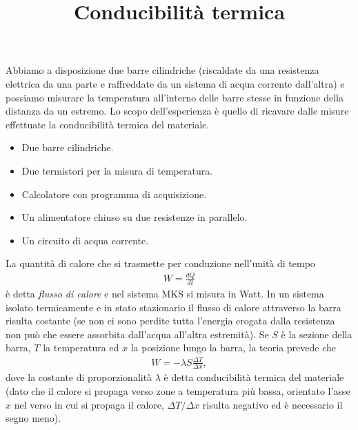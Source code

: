 \documentclass{lab1-article}
\title{Conducibilit\`a termica}
\begin{document}
\begin{article}

\maketitle

\secsummary
Abbiamo a disposizione due barre cilindriche (riscaldate da una resistenza
elettrica da una parte e raffreddate da un sistema di acqua corrente dall'altra)
e possiamo misurare la temperatura all'interno delle barre stesse in
funzione della distanza da un estremo.
Lo scopo dell'esperienza \`e quello di ricavare dalle misure effettuate
la conducibilit\`a termica del materiale.


\secmaterials

\begin{itemize}
\item Due barre cilindriche.
\item Due termistori per la misura di temperatura.
\item Calcolatore con programma di acquisizione.
\item Un alimentatore chiuso su due resistenze in parallelo.
\item Un circuito di acqua corrente.
\end{itemize}


\secmeasurements

La quantit\`a di calore che si trasmette per conduzione nell'unit\`a di tempo
\begin{align}
  W = \frac{dQ}{dt}
\end{align}
\`e detta \emph{flusso di calore} e nel sistema MKS si misura in Watt.
In un sistema isolato termicamente e in stato stazionario il flusso di calore attraverso la barra risulta costante
(se non ci sono perdite tutta l'energia erogata dalla resistenza non pu\`o che
essere assorbita dall'acqua all'altra estremit\`a). Se $S$ \`e la sezione
della barra, $T$ la temperatura ed $x$ la posizione lungo la barra, la
teoria prevede che
\begin{align}\label{eq:conduction}
  W = -\lambda S \frac{\Delta T}{\Delta x},
\end{align}
dove la costante di proporzionalit\`a $\lambda$ \`e detta conducibilit\`a
termica del materiale (dato che il calore si propaga verso zone a temperatura
pi\`u bassa, orientato l'asse $x$ nel verso in cui si propaga il calore,
$\Delta T/\Delta x$ risulta negativo ed \`e necessario il segno meno).



\end{article}
\end{document}
